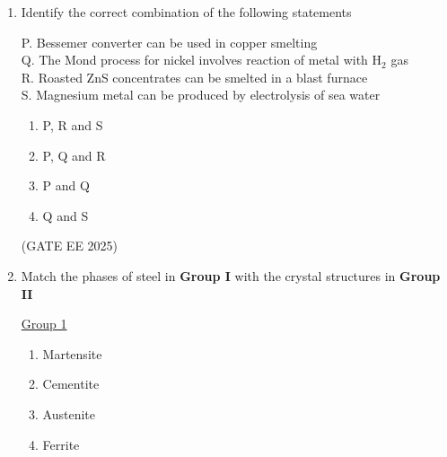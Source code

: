 \documentclass[11pt, letterpaper]{article}
\theoremstyle{remark}
\begin{document}
\begin{enumerate}
\begin{multicols}{2}
\underline{Group 2}
\begin{enumerate}[label=(\arabic*), start=1]
\item Lead 
\item Copper
\item Aluminium
\item Gold
\end{enumerate}
\end{multicols}

\begin{multicols}{2}
\begin{enumerate}[(A)]
\item P-1, Q-2, R-1, S-4
\item P-2, Q-3, R-1, S-4
\item P-2, Q-1, R-3, S-4
\item P-2, Q-3, R-4, S-1
\end{enumerate}
\end{multicols}
\hfill(GATE EE 2025)

\item Identify the correct combination of the following statements

P. Bessemer converter can be used in copper smelting \\
Q. The Mond process for nickel involves reaction of metal with H$_2$ gas \\
R. Roasted ZnS concentrates can be smelted in a blast furnace \\
S. Magnesium metal can be produced by electrolysis of sea water

\begin{multicols}{2}
\begin{enumerate}  
\item P, R and S
\item P, Q and R
\item P and Q
\item Q and S
\end{enumerate}
\end{multicols}
\hfill(GATE EE 2025)

\item Match the phases of steel in \textbf{Group I} with the crystal structures in \textbf{Group II}
\begin{multicols}{2}
\underline{Group 1}
\begin{enumerate}[label=(\Alph*), start=16]
\item Martensite   
\item Cementite
\item Austenite  
\item Ferrite
\end{enumerate}


\end{multicols}
\end{enumerate}
\end{document}
